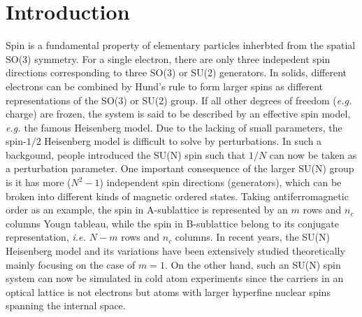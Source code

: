 \documentclass[aps,twocolumn,superscriptaddress]{revtex4-1}
\newcommand{\ie}{\textit{i.e.{ }}}
\newcommand{\eg}{\textit{e.g.{ }}}
\begin{document}
\section{Introduction}
Spin is a fundamental property of elementary particles inherbted from the spatial SO(3) symmetry. For a single electron, there are only three indepedent spin directions corresponding to three SO(3) or SU(2) generators. In solids, different electrons can be combined by Hund's rule to form larger spins as different representations of the SO(3) or SU(2) group. If all other degrees of freedom (\eg charge) are frozen, the system is said to be described by an effective spin model, \eg the famous Heisenberg model. Due to the lacking of small parameters, the spin-$1/2$ Heisenberg model is difficult to solve by perturbations. In such a backgound, people introduced the SU(N) spin such that $1/N$ can now be taken as a perturbation parameter. One important consequence of the larger SU(N) group is it has more ($N^2-1$) independent spin directions (generators), which can be broken into different kinds of magnetic ordered states. Taking antiferromagnetic order as an example, the spin in A-sublattice is represented by an $m$ rows and $n_c$ columns Yougn tableau, while the spin in B-sublattice belong to its conjugate representation, \ie $N-m$ rows and $n_c$ columns. In recent years, the SU(N) Heisenberg model and its variations have been extensively studied theoretically mainly focusing on the case of $m=1$. On the other hand, such an SU(N) spin system can now be simulated in cold atom experiments since the carriers in an optical lattice is not electrons but atoms with larger hyperfine nuclear spins spanning the internal space. 
\end{document}
